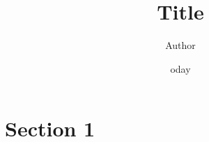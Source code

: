 \documentclass[11pt]{article}
\title{ Title}
\author{ Author }
\date{	oday}
\begin{document}
                
\maketitle	
                
\lipsum[2-10]
                
\section{Section 1}
                
\lipsum[2-10]
                
\pagebreak
                
\end{document}
